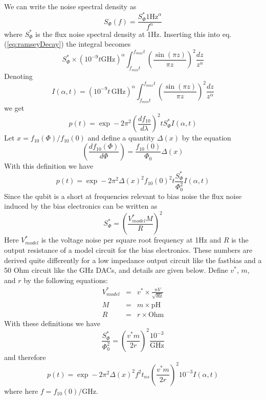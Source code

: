 \documentclass[twocolumn]{article}
\begin{document}
We can write the noise spectral density as \begin{equation}
S_{\Phi}(f) = \frac{S^*_{\Phi}1\textrm{Hz}^{\alpha}}{f^{\alpha}} \end{equation}
where $S^*_{\Phi}$ is the flux noise spectral density at 1Hz. Inserting this into eq. (\ref{eq:ramseyDecay}) the integral becomes \begin{equation}
S^*_{\Phi} \times (10^{-9} t \textrm{GHz})^{\alpha} \int_{f_{min}t}^{f_{max}t}\left( \frac{\sin(\pi z)}{\pi z}\right)^2 \frac{dz}{z^{\alpha}} \end{equation}
Denoting \begin{equation}
I(\alpha, t) = (10^{-9}t\,\textrm{GHz})^{\alpha} \int_{f_{min}t}^{f_{max}t} \left(\frac{\sin(\pi z)}{\pi z}\right)^2 \frac{dz}{z^{\alpha}}
\end{equation}
we get \begin{equation}
p(t) = \exp -2\pi^2 \left( \frac{df_{10}}{d\lambda} \right)^2 t S_{\Phi}^* I(\alpha, t) \end{equation}
Let $x = f_{10}(\Phi)/f_{10}(0)$ and define a quantity $\Delta(x)$ by the equation \begin{equation}
\left( \frac{df_{10}(\Phi)}{d\Phi} \right) = \frac{f_{10}(0)}{\Phi_0}\Delta(x) \end{equation}
With this definition we have \begin{equation}
p(t) = \exp -2\pi^2 \Delta(x)^2 f_{10}(0)^2 t \frac{S_{\Phi}^*}{\Phi_0^2} I(\alpha,t) \end{equation}
Since the qubit is a short at frequencies relevant to bias noise the flux noise induced by the bias electronics can be written as \begin{equation}
S^*_{\Phi} = \left(\frac{V^*_{model}M}{R}\right)^2 \end{equation}
Here $V^*_{model}$ is the voltage noise per square root frequency at 1Hz and $R$ is the output resistance of a model circuit for the bias electronics. These numbers are derived quite differently for a low impedance output circuit like the fastbias and a 50 Ohm circuit like the GHz DACs, and details are given below. Define $v^*$, $m$, and $r$ by the following equations: \begin{eqnarray}
V^*_{model} &=& v^*\times \frac{nV}{\sqrt{\textrm{Hz}}} \nonumber \\
M &=& m\times\textrm{pH} \nonumber \\
R &=& r \times \textrm{Ohm} \nonumber \end{eqnarray}
With these definitions we have \begin{equation}
\frac{S^*_{\Phi}}{\Phi_0^2} = \left( \frac{v^*m}{2r} \right)^2 \frac{10^{-3}}{\textrm{GHz}} \end{equation}
and therefore \begin{equation}
p(t) = \exp -2\pi^2 \Delta(x)^2 f^2 t_{ns} \left(\frac{v^* m}{2r} \right)^2 10^{-3} I(\alpha,t) \end{equation}
where here $f = f_{10}(0)/\textrm{GHz}$.
\end{document}
